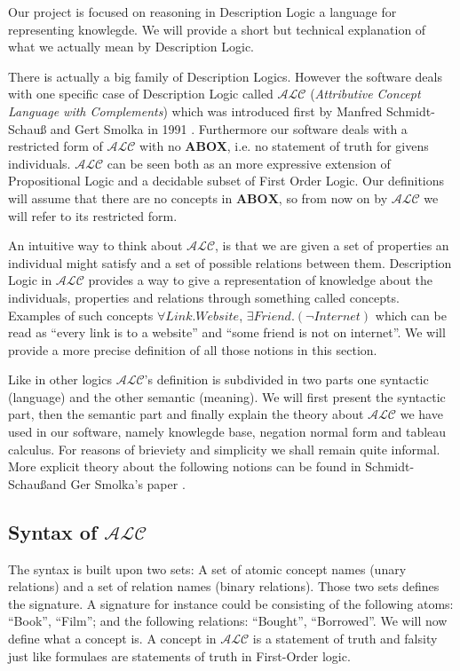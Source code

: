 Our project is focused on reasoning in Description Logic a language
for representing knowlegde. We will provide a short but technical
explanation of what we actually mean by Description Logic. 

There is actually a big family of Description Logics. However the
software deals with one specific case of Description Logic called
$\mathcal{ALC}$ (\textit{Attributive Concept Language with
Complements}) which was introduced first by Manfred Schmidt-Schau\ss
and Gert Smolka in 1991 \cite{msgs}. Furthermore our software deals
with a restricted form of $\mathcal{ALC}$ with no \textbf{ABOX},
i.e. no statement of truth for givens individuals. $\mathcal{ALC}$ can
be seen both as an more expressive extension of Propositional Logic
and a decidable subset of First Order Logic. Our definitions will
assume that there are no concepts in $\textbf{ABOX}$, so from now on by
$\mathcal{ALC}$ we will refer to its restricted form.

An intuitive way to think about $\mathcal{ALC}$, is that we are given
a set of properties an individual might satisfy and a set of possible
relations between them. Description Logic in $\mathcal{ALC}$ provides
a way to give a representation of knowledge about the individuals,
properties and relations through something called concepts. Examples
of such concepts $\forall Link . Website$, $\exists Friend . (\neg
Internet)$ which can be read as ``every link is to a website'' and
``some friend is not on internet''. We will provide a more precise
definition of all those notions in this section.

Like in other logics $\mathcal{ALC}$'s definition is subdivided in two
parts one syntactic (language) and the other semantic (meaning). We
will first present the syntactic part, then the semantic part and
finally explain the theory about $\mathcal{ALC}$ we have used in our
software, namely knowlegde base, negation normal form and tableau
calculus. For reasons of brieviety and simplicity we shall remain
quite informal. More explicit theory about the following notions can be
found in Schmidt-Schau\ss and Ger Smolka's paper \cite{msgs}.

\subsection{Syntax of $\mathcal{ALC}$}

The syntax is built upon two sets: A set of atomic concept names
(unary relations) and a set of relation names (binary
relations). Those two sets defines the signature. A signature for
instance could be consisting of the following atoms: ``Book'',
``Film''; and the following relations: ``Bought'', ``Borrowed''. We
will now define what a concept is. A concept in $\mathcal{ALC}$ is a
statement of truth and falsity just like formulaes are statements of
truth in First-Order logic.

